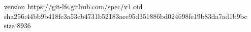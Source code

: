 version https://git-lfs.github.com/spec/v1
oid sha256:44bb9b418fc3a53cb4731b52183aee95d351886bd024698fe19b83da7ad1b9bc
size 8936
